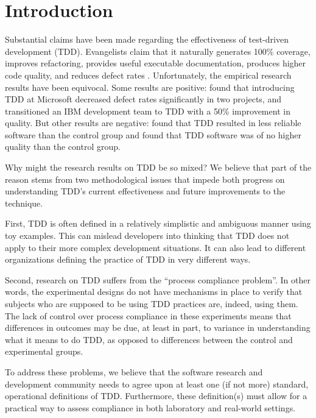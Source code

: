 \documentclass[smallextended]{svjour3}     %
\begin{document}
\section{Introduction}
\label{intro}

Substantial claims have been made regarding the effectiveness of
test-driven development (TDD). Evangelists claim that it naturally
generates 100\% coverage, improves refactoring, provides useful executable
documentation, produces higher code quality, and reduces defect rates
\citep{Beck:03}.  Unfortunately, the empirical research results have been
equivocal.  Some results are positive: \cite{Bhat:06} found that
introducing TDD at Microsoft decreased defect rates significantly in two
projects, and \cite{Maximilien:03} transitioned an IBM development team to
TDD with a 50\% improvement in quality. But other results are negative:
\cite{Muller:02} found that TDD resulted in less reliable software than the
control group and \cite{Erdogmus:05} found that TDD software was of no
higher quality than the control group.

Why might the research results on TDD be so mixed?  We believe that part of
the reason stems from two methodological issues that impede both progress
on understanding TDD's current effectiveness and future improvements to the
technique. 

First, TDD is often defined in a relatively simplistic and ambiguous manner
using toy examples.  This can mislead developers into thinking that TDD
does not apply to their more complex development situations. It can also
lead to different organizations defining the practice of TDD in very
different ways.

Second, research on TDD suffers from the ``process compliance problem''.
In other words, the experimental designs do not have mechanisms in place to
verify that subjects who are supposed to be using TDD practices are,
indeed, using them.  The lack of control over process compliance in these
experiments means that differences in outcomes may be due, at least in
part, to variance in understanding what it means to do TDD, as opposed to
differences between the control and experimental groups.

To address these problems, we believe that the software research and
development community needs to agree upon at least one (if not more)
standard, operational definitions of TDD. Furthermore, these definition(s)
must allow for a practical way to assess compliance in both laboratory and
real-world settings.
\end{document}
